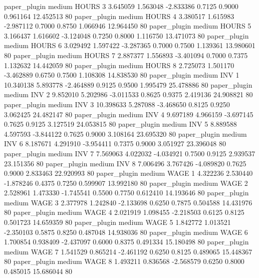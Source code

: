           paper_plugin     medium    HOURS                 3  3.645059 1.563048 -2.833386 0.7125 0.9000  0.961164   12.452513 80
          paper_plugin     medium    HOURS                 4  3.380517 1.615983 -2.987112 0.7000 0.8750  1.066946   12.964450 80
          paper_plugin     medium    HOURS                 5  3.166437 1.616602 -3.124048 0.7250 0.8000  1.116750   13.471073 80
          paper_plugin     medium    HOURS                 6  3.029492 1.597422 -3.287365 0.7000 0.7500  1.139361   13.980601 80
          paper_plugin     medium    HOURS                 7  2.887377 1.556893 -3.401094 0.7000 0.7375  1.132632   14.442059 80
          paper_plugin     medium    HOURS                 8  2.725073 1.501170 -3.462889 0.6750 0.7500  1.108308   14.838530 80
          paper_plugin     medium      INV                 1 10.340138 5.893778 -2.464889 0.9125 0.9500  1.995479   25.478886 80
          paper_plugin     medium      INV                 2  9.852010 5.202986 -3.011533 0.8625 0.9375  2.419136   24.908821 80
          paper_plugin     medium      INV                 3 10.398633 5.287088 -3.468650 0.8125 0.9250  3.062425   24.482147 80
          paper_plugin     medium      INV                 4  9.697189 4.966159 -3.697145 0.7625 0.9125  3.127519   24.053815 80
          paper_plugin     medium      INV                 5  8.889588 4.597593 -3.844122 0.7625 0.9000  3.108164   23.695320 80
          paper_plugin     medium      INV                 6  8.187671 4.291910 -3.954411 0.7375 0.9000  3.051927   23.396048 80
          paper_plugin     medium      INV                 7  7.569063 4.022032 -4.034921 0.7500 0.9125  2.939537   23.151356 80
          paper_plugin     medium      INV                 8  7.006496 3.767426 -4.089820 0.7625 0.9000  2.833463   22.920993 80
          paper_plugin     medium     WAGE                 1  4.322236 2.530440 -1.878246 0.4375 0.7250  0.599907   13.992180 80
          paper_plugin     medium     WAGE                 2  2.528961 1.473330 -1.745541 0.5500 0.7750  0.612410   14.193646 80
          paper_plugin     medium     WAGE                 3  2.377978 1.242840 -2.133698 0.6250 0.7875  0.504588   14.431976 80
          paper_plugin     medium     WAGE                 4  2.021919 1.098455 -2.218503 0.6125 0.8125  0.501723   14.659359 80
          paper_plugin     medium     WAGE                 5  1.842772 1.013521 -2.350103 0.5875 0.8250  0.487048   14.938036 80
          paper_plugin     medium     WAGE                 6  1.700854 0.938409 -2.437097 0.6000 0.8375  0.491334   15.180498 80
          paper_plugin     medium     WAGE                 7  1.541529 0.865214 -2.461192 0.6250 0.8125  0.489065   15.448367 80
          paper_plugin     medium     WAGE                 8  1.493211 0.836568 -2.568579 0.6250 0.8000  0.485015   15.686044 80